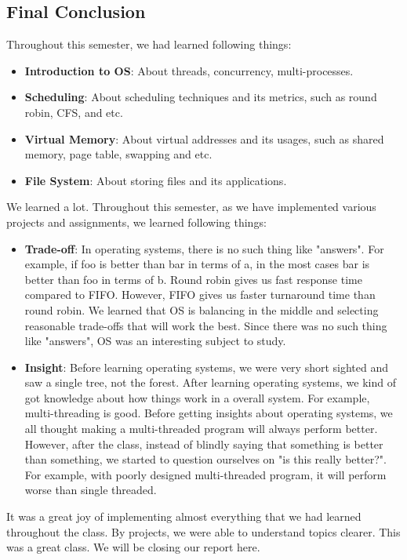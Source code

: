 \documentclass{homework}
\begin{document}
\subsection{Final Conclusion}
Throughout this semester, we had learned following things:
\begin{itemize}
    \item \textbf{Introduction to OS}: About threads, concurrency, multi-processes.
    \item \textbf{Scheduling}: About scheduling techniques and its metrics, such as round robin, CFS, and etc.
    \item \textbf{Virtual Memory}: About virtual addresses and its usages, such as shared memory, page table, swapping and etc.
    \item \textbf{File System}: About storing files and its applications.
\end{itemize}
We learned a lot. Throughout this semester, as we have implemented various projects and assignments, we learned following things:

\begin{itemize}
    \item \textbf{Trade-off}: In operating systems, there is no such thing like "answers". For example, if foo is better than bar in terms of a, in the most cases bar is better than foo in terms of b. Round robin gives us fast response time compared to FIFO. However, FIFO gives us faster turnaround time than round robin. We learned that OS is balancing in the middle and selecting reasonable trade-offs that will work the best. Since there was no such thing like "answers", OS was an interesting subject to study.
    \item \textbf{Insight}: Before learning operating systems, we were very short sighted and saw a single tree, not the forest. After learning operating systems, we kind of got knowledge about how things work in a overall system. For example, multi-threading is good. Before getting insights about operating systems, we all thought making a multi-threaded program will always perform better. However, after the class, instead of blindly saying that something is better than something, we started to question ourselves on "is this really better?". For example, with poorly designed multi-threaded program, it will perform worse than single threaded.
\end{itemize}
It was a great joy of implementing almost everything that we had learned throughout the class. By projects, we were able to understand topics clearer. This was a great class. We will be closing our report here.
\end{document}
